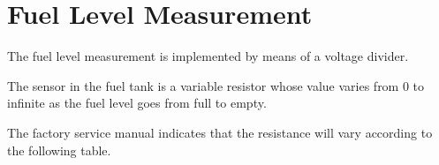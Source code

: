 \chapter{Fuel Level Measurement}

The fuel level measurement is implemented by means of a voltage divider\cite{some_voltage_divider_ref}.

The sensor in the fuel tank is a variable resistor whose value varies from 0 to infinite as the fuel level goes from full to empty.

The factory service manual indicates that the resistance will vary according to the following table.

